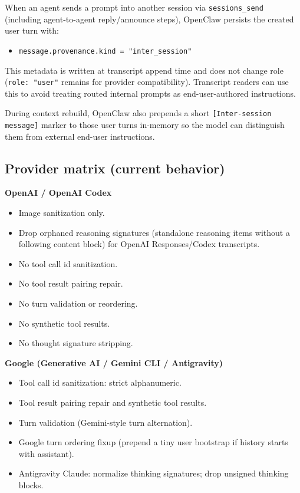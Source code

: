 When an agent sends a prompt into another session via \texttt{sessions\_send} (including
agent-to-agent reply/announce steps), OpenClaw persists the created user turn with:

\begin{itemize}
  \item \texttt{message.provenance.kind = "inter\_session"}
\end{itemize}


This metadata is written at transcript append time and does not change role
(\texttt{role: "user"} remains for provider compatibility). Transcript readers can use
this to avoid treating routed internal prompts as end-user-authored instructions.

During context rebuild, OpenClaw also prepends a short \texttt{[Inter-session message]}
marker to those user turns in-memory so the model can distinguish them from
external end-user instructions.

\hrulefill


\subsection{Provider matrix (current behavior)}


\textbf{OpenAI / OpenAI Codex}

\begin{itemize}
  \item Image sanitization only.
  \item Drop orphaned reasoning signatures (standalone reasoning items without a following content block) for OpenAI Responses/Codex transcripts.
  \item No tool call id sanitization.
  \item No tool result pairing repair.
  \item No turn validation or reordering.
  \item No synthetic tool results.
  \item No thought signature stripping.
\end{itemize}


\textbf{Google (Generative AI / Gemini CLI / Antigravity)}

\begin{itemize}
  \item Tool call id sanitization: strict alphanumeric.
  \item Tool result pairing repair and synthetic tool results.
  \item Turn validation (Gemini-style turn alternation).
  \item Google turn ordering fixup (prepend a tiny user bootstrap if history starts with assistant).
  \item Antigravity Claude: normalize thinking signatures; drop unsigned thinking blocks.
\end{itemize}


